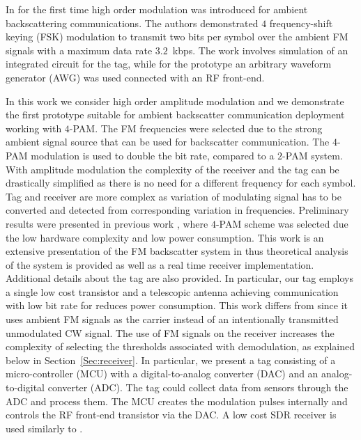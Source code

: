\documentclass[journal]{IEEEtran}
\begin{document}
In \cite{wang2017fm} for the first time  high order modulation  was introduced for ambient backscattering communications. 
%
The authors demonstrated $4$ frequency-shift keying (FSK) modulation to transmit two bits per symbol over the ambient FM signals with a maximum data rate $3.2$~kbps.
%
The work involves simulation of an integrated circuit for the tag, while for the prototype an arbitrary waveform generator (AWG) was used connected with an RF front-end.


In this work we consider high order amplitude modulation 
and we demonstrate the first prototype suitable for ambient backscatter communication deployment working with $4$-PAM.
%
 The FM frequencies were selected due to the strong ambient signal source that can be used for backscatter communication.
%
The $4$-PAM  modulation is used to double the bit rate, compared to a $2$-PAM system.
%
With amplitude modulation the complexity of the  receiver and the tag can be drastically simplified as there is no need for a different frequency for each symbol.
%
Tag and receiver are more complex as variation of modulating signal has to be converted and detected from corresponding variation in frequencies.
%
Preliminary results were presented in previous work  \cite{daskalakisims2018}, where  $4$-PAM scheme was selected due the low hardware complexity and low power consumption.
%
This work is an extensive presentation of the 
FM backscatter system  in \cite{daskalakisims2018} thus theoretical analysis of the system is provided as well as a real time receiver implementation. 
%
Additional details about the tag are also provided. 
%
In particular, our tag employs a single low cost transistor and a telescopic antenna achieving communication with low bit rate for reduces power consumption.
%
This work differs from \cite{thomas201296, correia2017quadrature} since it uses ambient FM signals as the carrier instead of an intentionally transmitted unmodulated CW signal.
%
The use of FM signals on the receiver increases the complexity of selecting the thresholds associated with demodulation, as explained below in Section~\ref{Sec:receiver}.
%
In particular,  we present a  tag consisting of  a micro-controller (MCU) with a digital-to-analog converter (DAC)  and an analog-to-digital converter (ADC).
%
The tag could collect data from sensors through the ADC and process them. 
%
The MCU creates the modulation pulses internally and controls the RF front-end transistor via the DAC.
%
A low cost SDR receiver is used similarly to \cite{daskalakis2017ambient}.   
%
\end{document}
